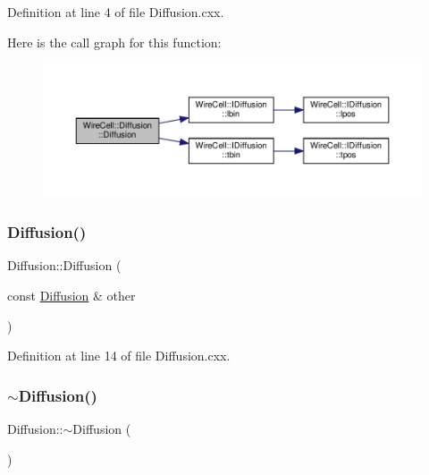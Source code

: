 Definition at line 4 of file Diffusion.\+cxx.

Here is the call graph for this function\+:
\nopagebreak
\begin{figure}[H]
\begin{center}
\leavevmode
\includegraphics[width=350pt]{class_wire_cell_1_1_diffusion_a5cec68960d93a5a1293b1c3539035cca_cgraph}
\end{center}
\end{figure}
\mbox{\label{class_wire_cell_1_1_diffusion_a3665efc0e63c028a68813b8feb87dfb2}} 
\subsubsection{\texorpdfstring{Diffusion()}{Diffusion()}\hspace{0.1cm}{\footnotesize\ttfamily [2/2]}}
{\footnotesize\ttfamily Diffusion\+::\+Diffusion (\begin{DoxyParamCaption}\item[{const \hyperlink{class_wire_cell_1_1_diffusion}{Diffusion} \&}]{other }\end{DoxyParamCaption})}



Definition at line 14 of file Diffusion.\+cxx.

\mbox{\label{class_wire_cell_1_1_diffusion_a70bb6c0517b78c64ef52677863858a79}} 
\subsubsection{\texorpdfstring{$\sim$\+Diffusion()}{~Diffusion()}}
{\footnotesize\ttfamily Diffusion\+::$\sim$\+Diffusion (\begin{DoxyParamCaption}{ }\end{DoxyParamCaption})\hspace{0.3cm}{\ttfamily [virtual]}}



